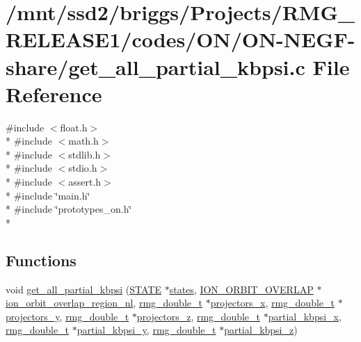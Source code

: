 \hypertarget{_o_n_2_o_n-_n_e_g_f-share_2get__all__partial__kbpsi_8c}{\section{/mnt/ssd2/briggs/\-Projects/\-R\-M\-G\-\_\-\-R\-E\-L\-E\-A\-S\-E1/codes/\-O\-N/\-O\-N-\/\-N\-E\-G\-F-\/share/get\-\_\-all\-\_\-partial\-\_\-kbpsi.c File Reference}
\label{_o_n_2_o_n-_n_e_g_f-share_2get__all__partial__kbpsi_8c}
}
{\ttfamily \#include $<$float.\-h$>$}\\*
{\ttfamily \#include $<$math.\-h$>$}\\*
{\ttfamily \#include $<$stdlib.\-h$>$}\\*
{\ttfamily \#include $<$stdio.\-h$>$}\\*
{\ttfamily \#include $<$assert.\-h$>$}\\*
{\ttfamily \#include \char`\"{}main.\-h\char`\"{}}\\*
{\ttfamily \#include \char`\"{}prototypes\-\_\-on.\-h\char`\"{}}\\*
\subsection*{Functions}
\begin{DoxyCompactItemize}
\item 
void \hyperlink{_o_n_2_o_n-_n_e_g_f-share_2get__all__partial__kbpsi_8c_a7e293b1e3959161efadaf4419339f00f}{get\-\_\-all\-\_\-partial\-\_\-kbpsi} (\hyperlink{struct_s_t_a_t_e}{S\-T\-A\-T\-E} $\ast$\hyperlink{md_8h_a286ebf6b996d2b1827eb9a889dfc83d7}{states}, \hyperlink{struct_i_o_n___o_r_b_i_t___o_v_e_r_l_a_p}{I\-O\-N\-\_\-\-O\-R\-B\-I\-T\-\_\-\-O\-V\-E\-R\-L\-A\-P} $\ast$\hyperlink{overlap_8h_a3f6f41aad9960000a7629ce965eba61d}{ion\-\_\-orbit\-\_\-overlap\-\_\-region\-\_\-nl}, \hyperlink{rmgtypes_8h_aaa16921c14f121c56eaa42390a340db8}{rmg\-\_\-double\-\_\-t} $\ast$\hyperlink{md_8h_a7b60e48fe4b479cc787dc60db07bddeb}{projectors\-\_\-x}, \hyperlink{rmgtypes_8h_aaa16921c14f121c56eaa42390a340db8}{rmg\-\_\-double\-\_\-t} $\ast$\hyperlink{md_8h_a0425c80068250bf9782b4ad1be2ee128}{projectors\-\_\-y}, \hyperlink{rmgtypes_8h_aaa16921c14f121c56eaa42390a340db8}{rmg\-\_\-double\-\_\-t} $\ast$\hyperlink{md_8h_a04cd90c8d8f0571b91b0f0096ea38e67}{projectors\-\_\-z}, \hyperlink{rmgtypes_8h_aaa16921c14f121c56eaa42390a340db8}{rmg\-\_\-double\-\_\-t} $\ast$\hyperlink{overlap_8h_a117ec3d74e2a63425e7939f42e9fe35f}{partial\-\_\-kbpsi\-\_\-x}, \hyperlink{rmgtypes_8h_aaa16921c14f121c56eaa42390a340db8}{rmg\-\_\-double\-\_\-t} $\ast$\hyperlink{overlap_8h_acd5b56478de35e171d6c4636c8f214fa}{partial\-\_\-kbpsi\-\_\-y}, \hyperlink{rmgtypes_8h_aaa16921c14f121c56eaa42390a340db8}{rmg\-\_\-double\-\_\-t} $\ast$\hyperlink{overlap_8h_a3862e2c1d647f8eeda152e38b661ff54}{partial\-\_\-kbpsi\-\_\-z})
\end{DoxyCompactItemize}


